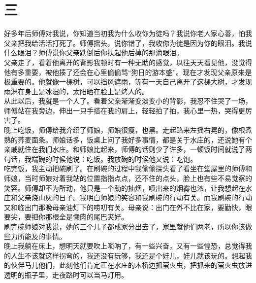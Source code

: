 \fancyhead[RO]{\thepage} %
\fancyhead[LE]{\thepage} %
\fancyfoot[LE,RO]{}
\fancyfoot[LO,CE]{}
\fancyfoot[CO,RE]{}
\chapter*{三}
好多年后师傅对我说，你知道当初我为什么收你为徒吗？我说你老人家心善，怕我父亲把我给活活打死了。师傅摇头，说你错了，我收你为徒是因为你的眼泪。我说什么眼泪？师傅说你父亲跌倒后你扶起他后掉的那滴眼泪。
\\

父亲走了，看着他离开的背影我顿时有一种无助的感觉，以往天天看见他，没觉得他有多重要，被他揍了还会在心里偷偷骂“狗日的游本盛”。现在才发现父亲原来是极重要的。他就像一棵树，可以挡风遮雨，等有一天自己离开了这棵大树，才发现雨淋在身上是冰湿的，太阳晒在脸上是烤人的。\\

从此以后，我就是一个人了。看着父亲渐渐变淡变小的背影，我忍不住哭了一场，师傅站在我旁边，伸出一只手搭在我的肩上，轻轻拍了拍，我心里一热，哭得更厉害了。
\\

晚上吃饭，师傅给我介绍了师娘，师娘很瘦，也黑。走起路来左摇右晃的，像根煮熟的荞麦面条。师娘话多，饭桌上问了我好多事情，都是关于水庄的，还说她有个亲戚就住在我们水庄。和师娘比起来，师傅的话则少了许多，一顿饭时间就说了两句话，我端碗的时候他说：吃饭。我放碗的时候他又说：吃饱。
\\

吃完饭，我主动把碗刷了。在刷碗的过程中我偷偷探头看了看坐在堂屋里的师傅和师娘，当时师娘对着我站的位置指指点点，还不住的点头，脸上也有些不易觉察的笑容。师傅却不为所动，他只是一个劲的抽烟，喷出来的烟雾也浓，让我想起在水庄和父亲烧山灰的日子。我明白师娘的笑容和我刷碗的行动有关。而我刷碗的行动又和临出门那晚母亲油灯下的唠叨有关。母亲说：出门在外不比在家，要勤快，眼要尖，要把你那根全是懒肉的尾巴夹好。
\\

刷完碗师娘对我说，她的三个儿子都成家分出去了，家里就他们两老，所以你该做些力所能及的事情。
\\

晚上我躺在床上，想明天就要吹上唢呐了，有一些兴奋，又有一些惶恐，总觉得我的人生不该就这样拐弯的，我还没有玩够，我还是个娃儿，娃儿就该玩的。想起我的伙伴马儿他们，此刻他们肯定正在水庄的木桥边抓萤火虫，把抓来的萤火虫放进透明的瓶子里，走夜路时可以当马灯用。
\\

